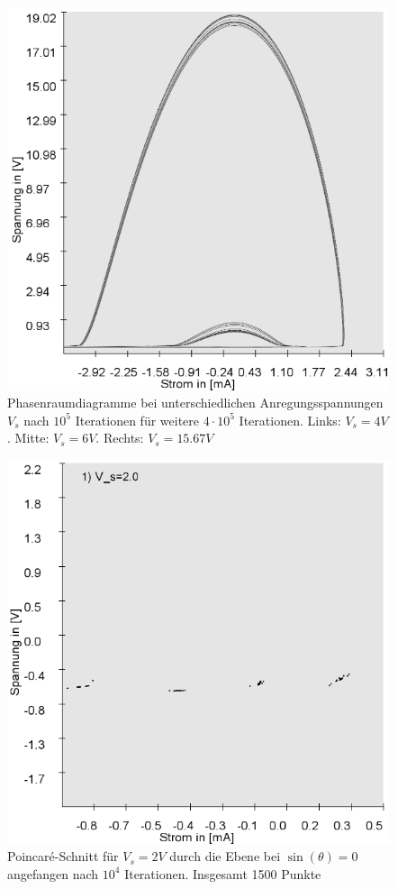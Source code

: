 \documentclass{scrartcl}
\begin{document}
\begin{figure}
\includegraphics[scale=0.28]{V_s-15-67V}
\caption{Phasenraumdiagramme bei unterschiedlichen Anregungsspannungen $V_s$ nach $10^5$ Iterationen für weitere $4 \cdot 10^5$ Iterationen. Links: $V_s=4V$. Mitte: $V_s=6V$. Rechts: $V_s=15.67V$}
\label{fig:ldr-prd}
\end{figure}

\begin{figure}
\includegraphics[scale=0.5]{Poincare-nach10000iterations}
\caption{Poincaré-Schnitt für $V_s=2V$ durch die Ebene bei $\sin(\theta)=0$ angefangen nach $10^4$ Iterationen. Insgesamt 1500 Punkte}
\label{fig:ldr-prd}
\end{figure}
\end{document}
